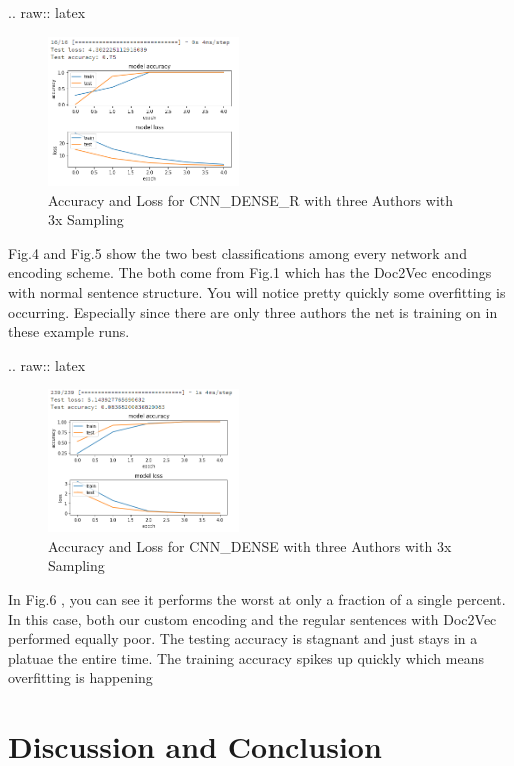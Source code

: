 \documentclass[conference]{IEEEtran}
\begin{document}
.. raw:: latex

   \begin{figure}[h!]
     \centering
       \includegraphics[width=0.45\textwidth]{CNN_DENSE_3_REGULARIZERS_OVERSAMPLING_RESULTS}
     \caption{Accuracy and Loss for CNN\_DENSE\_R with three Authors with 3x Sampling}
   \end{figure}

Fig.4 and Fig.5 show the two best classifications among every network
and encoding scheme. The both come from Fig.1 which has the Doc2Vec
encodings with normal sentence structure. You will notice pretty quickly
some overfitting is occurring. Especially since there are only three
authors the net is training on in these example runs.

.. raw:: latex

   \begin{figure}[h!]
     \centering
       \includegraphics[width=0.45\textwidth]{CNN_DENSE_OVERSAMPLING_RESULTS_35_AUTHORS}
     \caption{Accuracy and Loss for CNN\_DENSE with three Authors with 3x Sampling}
   \end{figure}

In Fig.6 , you can see it performs the worst at only a fraction of a
single percent. In this case, both our custom encoding and the regular
sentences with Doc2Vec performed equally poor. The testing accuracy is
stagnant and just stays in a platuae the entire time. The training
accuracy spikes up quickly which means overfitting is happening

\section{Discussion and Conclusion}
\end{document}
